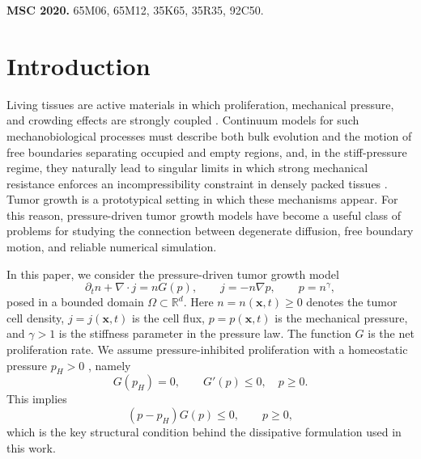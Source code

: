 \documentclass[11pt]{article}
\theoremstyle{plain}
\numberwithin{equation}{section}
\begin{document}
{\bf MSC 2020. } 65M06, 65M12, 35K65, 35R35, 92C50.

\section{Introduction}

Living tissues are active materials in which proliferation, mechanical
pressure, and crowding effects are strongly coupled
\cite{Basan2009,GomezGonzalez2020,Shraiman2005}. Continuum models for such
mechanobiological processes must describe both bulk evolution and the motion
of free boundaries separating occupied and empty regions, and, in the
stiff-pressure regime, they naturally lead to singular limits in which strong
mechanical resistance enforces an incompressibility constraint in densely
packed tissues
\cite{PerthameQuirosTangVauchelet2014,PerthameQuirosVazquez2014,PerthameVauchelet2015}.
Tumor growth is a prototypical setting in which these mechanisms appear. For
this reason, pressure-driven tumor growth models have become a useful class
of problems for studying the connection between degenerate diffusion, free
boundary motion, and reliable numerical simulation.

In this paper, we consider the pressure-driven tumor growth model
\cite{PerthameQuirosVazquez2014}
\begin{equation}\label{eq:tumor-model}
\partial_t n+\nabla\cdot j=nG(p),\qquad
j=-n\nabla p,\qquad
p=n^\gamma ,
\end{equation}
posed in a bounded domain \(\Omega\subset\mathbb R^d\). Here
\(n=n(\mathbf{x},t)\ge0\) denotes the tumor cell density,
\(j=j(\mathbf{x},t)\) is the cell flux, \(p=p(\mathbf{x},t)\) is the
mechanical pressure, and \(\gamma>1\) is the stiffness parameter in the
pressure law. The function \(G\) is the net proliferation rate. We assume
pressure-inhibited proliferation with a homeostatic pressure \(p_H>0\)
\cite{Basan2009,PerthameQuirosTangVauchelet2014,PerthameQuirosVazquez2014},
namely
\begin{equation}\label{eq:G_p_cond}
G(p_H)=0,\qquad G'(p)\le 0,\quad p\ge0 .
\end{equation}
This implies
\begin{equation}\label{eq:G_p_ineq}
(p-p_H)G(p)\le 0,\qquad p\ge0,
\end{equation}
which is the key structural condition behind the dissipative formulation
used in this work.
\end{document}
